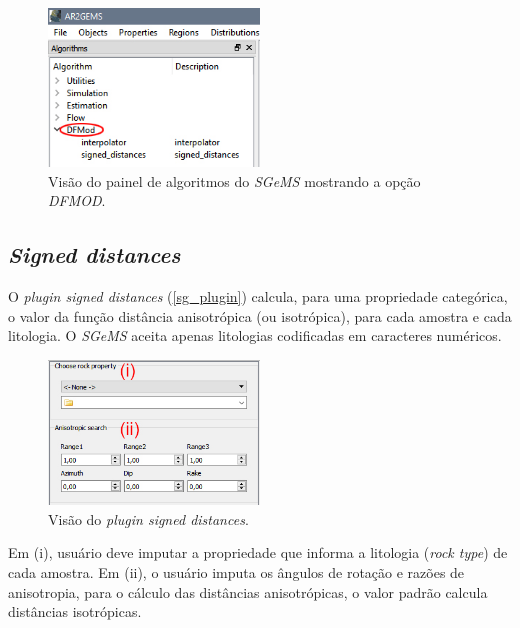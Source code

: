 \begin{figure}[!ht]
	\caption{\label{main_plugin}Visão do painel de algoritmos do \textit{SGeMS} mostrando a opção \textit{DFMOD}.}
	\begin{center}
		\includegraphics[width=0.5\textwidth]{modelagem_geologica/main}
	\end{center}
\end{figure}

\subsection{\textit{Signed distances}}\label{plugin_sg}

O \textit{plugin signed distances} (\autoref{sg_plugin}) calcula, para uma propriedade categórica, o valor da função distância anisotrópica (ou isotrópica), para cada amostra e cada litologia. O \textit{SGeMS} aceita apenas litologias codificadas em caracteres numéricos.   

\begin{figure}[H]
	\caption{\label{sg_plugin}Visão do \textit{plugin signed distances}.}
	\begin{center}
		\includegraphics[width=0.5\textwidth]{modelagem_geologica/sg_plugin}
	\end{center}
\end{figure}

Em (i), usuário deve imputar a propriedade que informa a litologia (\textit{rock type}) de cada amostra. Em (ii), o usuário imputa os ângulos de rotação e razões de anisotropia, para o cálculo das distâncias anisotrópicas, o valor padrão calcula distâncias isotrópicas.

